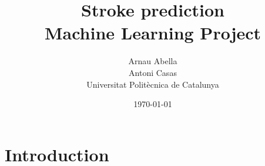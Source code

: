 \documentclass[12pt, a4paper]{article}
\title{%
  \vspace{-10ex}
  Stroke prediction\\
  \large{Machine Learning Project}
}
\author{%
  Arnau Abella \\
  Antoni Casas \\
  \large{Universitat Polit\`ecnica de Catalunya}
}
\date{\today}
\begin{document}
\maketitle

\vspace{5ex}

\section{Introduction}
\label{sec:introduction}



\end{document}
